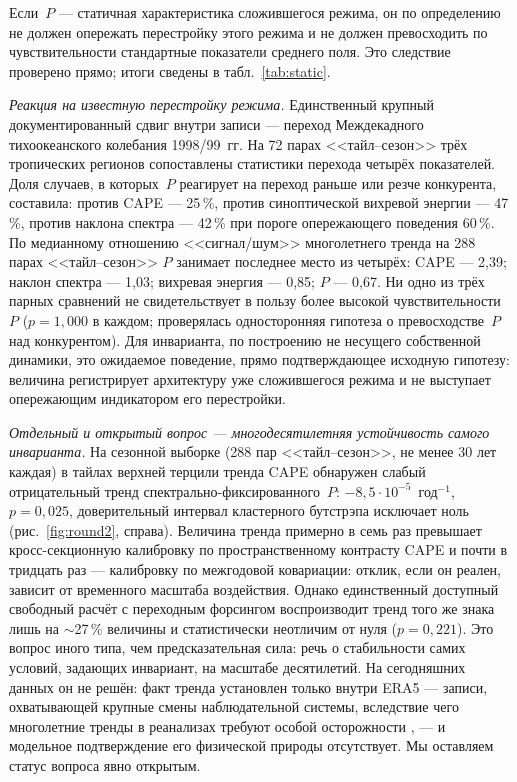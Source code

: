 \documentclass[11pt,a4paper]{article}
\begin{document}
Если~$P$ --- статичная характеристика сложившегося режима, он по определению не должен опережать перестройку этого режима и не должен превосходить по чувствительности стандартные показатели среднего поля. Это следствие проверено прямо; итоги сведены в табл.~\ref{tab:static}.

\emph{Реакция на известную перестройку режима.} Единственный крупный документированный сдвиг внутри записи --- переход Междекадного тихоокеанского колебания 1998/99~гг. На 72 парах <<тайл--сезон>> трёх тропических регионов сопоставлены статистики перехода четырёх показателей. Доля случаев, в которых~$P$ реагирует на переход раньше или резче конкурента, составила: против CAPE --- 25\,\%, против синоптической вихревой энергии --- 47\,\%, против наклона спектра --- 42\,\% при пороге опережающего поведения 60\,\%. По медианному отношению <<сигнал/шум>> многолетнего тренда на 288 парах <<тайл--сезон>> $P$ занимает последнее место из четырёх: CAPE --- 2,39; наклон спектра --- 1,03; вихревая энергия --- 0,85; $P$ --- 0,67. Ни одно из трёх парных сравнений не свидетельствует в пользу более высокой чувствительности~$P$ ($p=1{,}000$ в каждом; проверялась односторонняя гипотеза о превосходстве~$P$ над конкурентом). Для инварианта, по построению не несущего собственной динамики, это ожидаемое поведение, прямо подтверждающее исходную гипотезу: величина регистрирует архитектуру уже сложившегося режима и не выступает опережающим индикатором его перестройки.

\emph{Отдельный и открытый вопрос --- многодесятилетняя устойчивость самого инварианта.} На сезонной выборке (288 пар <<тайл--сезон>>, не менее 30 лет каждая) в тайлах верхней терцили тренда CAPE обнаружен слабый отрицательный тренд спектрально-фиксированного~$P$: $-8{,}5\cdot10^{-5}$~год$^{-1}$, $p=0{,}025$, доверительный интервал кластерного бутстрэпа исключает ноль (рис.~\ref{fig:round2}, справа). Величина тренда примерно в семь раз превышает кросс-секционную калибровку по пространственному контрасту CAPE и почти в тридцать раз --- калибровку по межгодовой ковариации: отклик, если он реален, зависит от временного масштаба воздействия. Однако единственный доступный свободный расчёт с переходным форсингом воспроизводит тренд того же знака лишь на $\sim$27\,\% величины и статистически неотличим от нуля ($p=0{,}221$). Это вопрос иного типа, чем предсказательная сила: речь о стабильности самих условий, задающих инвариант, на масштабе десятилетий. На сегодняшних данных он не решён: факт тренда установлен только внутри ERA5 --- записи, охватывающей крупные смены наблюдательной системы, вследствие чего многолетние тренды в реанализах требуют особой осторожности \cite{Bengtsson2004}, --- и модельное подтверждение его физической природы отсутствует. Мы оставляем статус вопроса явно открытым.
\end{document}
